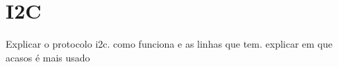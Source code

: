 
\chapter{I2C}
\label{chapter:i2c}


Explicar o protocolo i2c. como funciona e as linhas que tem. explicar em que acasos é mais usado


